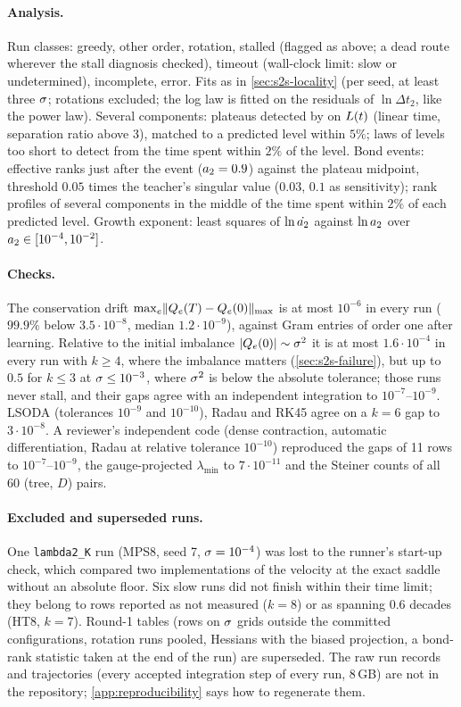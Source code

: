 \paragraph{Analysis.}
Run classes: greedy, other order, rotation, stalled (flagged as above; a dead route wherever the stall
diagnosis checked), timeout (wall-clock limit: slow or undetermined), incomplete, error. Fits as in
\cref{sec:s2s-locality} (per seed, at least three $\sigma$; rotations excluded; the log law is fitted on
the residuals of $\ln\Delta t_2$, like the power law). Several components: plateaus detected by
 on $L(t)$ (linear time, separation ratio above $3$), matched to
a predicted level within $5\%$; laws of levels too short to detect from the time spent within $2\%$ of
the level. Bond events: effective ranks just after the event ($a_{2}=0.9$) against the plateau midpoint,
threshold $0.05$ times the teacher's singular value ($0.03$, $0.1$ as sensitivity); rank profiles of
several components in the middle of the time spent within $2\%$ of each predicted level. Growth
exponent: least squares of $\ln\dot{a_{2}}$ against $\ln a_{2}$ over $a_{2}\in[10^{-4},10^{-2}]$.

\paragraph{Checks.}
The conservation drift $\max_e\lVert Q_{e}(T)-Q_{e}(0)\rVert_{\max}$ is at most $10^{-6}$ in every run ($99.9\%$
below $3.5\cdot10^{-8}$, median $1.2\cdot10^{-9}$), against Gram entries of order one after learning.
Relative to the initial imbalance $\lvert Q_{e}(0)\rvert\sim\sigma^2$ it is at most $1.6\cdot10^{-4}$ in every run
with $k\ge4$, where the imbalance matters (\cref{sec:s2s-failure}), but up to $0.5$ for $k\le3$ at
$\sigma\le10^{-3}$, where $\sigma^2$ is below the absolute tolerance; those runs never stall, and their gaps
agree with an independent integration to $10^{-7}$--$10^{-9}$. LSODA (tolerances $10^{-9}$ and
$10^{-10}$), Radau and RK45 agree on a $k=6$ gap to $3\cdot10^{-8}$. A reviewer's independent code (dense
contraction, automatic differentiation, Radau at relative tolerance $10^{-10}$) reproduced the gaps of
11 rows to $10^{-7}$--$10^{-9}$, the gauge-projected $\lambda_{\min}$ to $7\cdot10^{-11}$ and the Steiner
counts of all 60 (tree, $D$) pairs.

\paragraph{Excluded and superseded runs.}
One \texttt{lambda2\_K} run (MPS8, seed 7, $\sigma=10^{-4}$) was lost to the runner's start-up check,
which compared two implementations of the velocity at the exact saddle without an absolute floor.
Six slow runs did not finish within their time limit; they belong to rows reported as not measured
($k=8$) or as spanning $0.6$ decades (HT8, $k=7$). Round-1 tables (rows on $\sigma$ grids outside the
committed configurations, rotation runs pooled, Hessians with the biased projection, a bond-rank
statistic taken at the end of the run) are superseded. The raw run records and trajectories (every
accepted integration step of every run, 8\,GB) are not in the repository; \cref{app:reproducibility}
says how to regenerate them.

